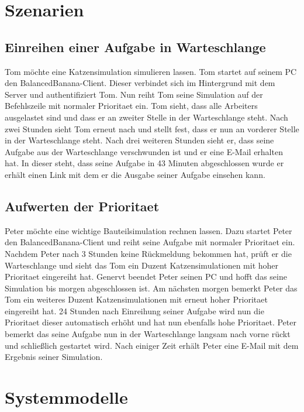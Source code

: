 \documentclass[a4paper,12pt]{article}
\begin{document}
\clearpage
\section{Szenarien}

\subsection{Einreihen einer \gls{Aufgabe} in \gls{Warteschlange}}
Tom möchte eine Katzensimulation simulieren lassen.
Tom startet auf seinem PC den BalancedBanana-\gls{Client}. Dieser verbindet sich im Hintergrund mit dem \gls{Server} und authentifiziert Tom.
Nun reiht Tom seine Simulation auf der \gls{Befehlszeile} mit normaler \gls{Prioritaet} ein.
Tom sieht, dass alle \glspl{Arbeiter} ausgelastet sind und dass er an zweiter Stelle in  der \gls{Warteschlange} steht.
Nach zwei Stunden sieht Tom erneut nach und stellt fest, dass er nun an vorderer Stelle in der \gls{Warteschlange} steht.
Nach drei weiteren Stunden sieht er, dass seine \gls{Aufgabe} aus der \gls{Warteschlange} verschwunden ist und er eine E-Mail erhalten hat.
In dieser steht, dass seine \gls{Aufgabe} in 43 Minuten abgeschlossen wurde er erhält einen Link mit dem er die Ausgabe seiner \gls{Aufgabe} einsehen kann.

\subsection{Aufwerten der \gls{Prioritaet}}
Peter möchte eine wichtige Bauteilsimulation rechnen lassen.
Dazu startet Peter den BalancedBanana-\gls{Client} und reiht seine \gls{Aufgabe} mit normaler \gls{Prioritaet} ein.
Nachdem Peter nach 3 Stunden keine Rückmeldung bekommen hat, prüft er die \gls{Warteschlange} und sieht das Tom ein Duzent Katzensimulationen mit hoher \gls{Prioritaet} eingereiht hat.
Genervt beendet Peter seinen PC und hofft das seine Simulation bis morgen abgeschlossen ist.
Am nächsten morgen bemerkt Peter das Tom ein weiteres Duzent Katzensimulationen mit erneut hoher \gls{Prioritaet} eingereiht hat.
24 Stunden nach Einreihung seiner \gls{Aufgabe} wird nun die \gls{Prioritaet} dieser automatisch erhöht und hat nun ebenfalls hohe \gls{Prioritaet}.
Peter bemerkt das seine \gls{Aufgabe} nun in der \gls{Warteschlange} langsam nach vorne rückt und schließlich gestartet wird. 
Nach einiger Zeit erhält Peter eine E-Mail mit dem Ergebnis seiner Simulation.

\clearpage

\section{Systemmodelle}
\end{document}
